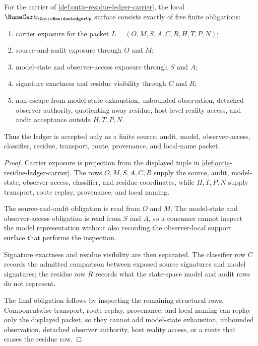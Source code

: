 \begin{theorem}
\label{thm:ontic-residue-ledger-namecert-obligations}
For the carrier of \autoref{def:ontic-residue-ledger-carrier}, the local $\NameCert_{\OnticResidueLedgerUp}$ surface consists exactly of five finite obligations:
\begin{enumerate}
\item carrier exposure for the packet $L=(O,M,S,A,C,R,H,T,P,N)$;
\item source-and-audit exposure through $O$ and $M$;
\item model-state and observer-access exposure through $S$ and $A$;
\item signature exactness and residue visibility through $C$ and $R$;
\item non-escape from model-state exhaustion, unbounded observation, detached observer authority, quotienting away residue, host-level reality access, and audit acceptance outside $H,T,P,N$.
\end{enumerate}
Thus the ledger is accepted only as a finite source, audit, model, observer-access, classifier, residue, transport, route, provenance, and local-name packet.
\end{theorem}
\begin{proof}
Carrier exposure is projection from the displayed tuple in \autoref{def:ontic-residue-ledger-carrier}. The rows $O,M,S,A,C,R$ supply the source, audit, model-state, observer-access, classifier, and residue coordinates, while $H,T,P,N$ supply transport, route replay, provenance, and local naming.

The source-and-audit obligation is read from $O$ and $M$. The model-state and observer-access obligation is read from $S$ and $A$, so a consumer cannot inspect the model representation without also recording the observer-local support surface that performs the inspection.

Signature exactness and residue visibility are then separated. The classifier row $C$ records the admitted comparison between exposed source signatures and model signatures; the residue row $R$ records what the state-space model and audit rows do not represent.

The final obligation follows by inspecting the remaining structural rows. Componentwise transport, route replay, provenance, and local naming can replay only the displayed packet, so they cannot add model-state exhaustion, unbounded observation, detached observer authority, host reality access, or a route that erases the residue row.
\end{proof}

